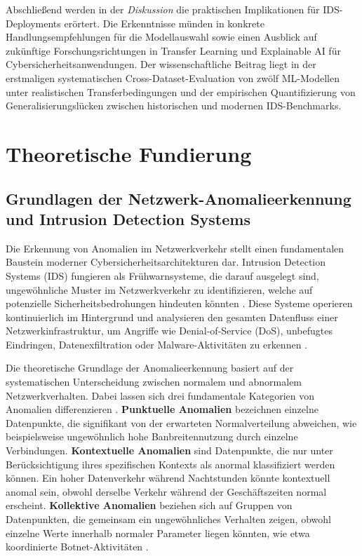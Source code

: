 \documentclass[11pt,a4paper]{article}
\begin{document}
    Abschließend werden in der \textit{Diskussion} die praktischen Implikationen für IDS-Deployments erörtert. Die Erkenntnisse münden in konkrete Handlungsempfehlungen für die Modellauswahl sowie einen Ausblick auf zukünftige Forschungsrichtungen in Transfer Learning und Explainable AI für Cybersicherheitsanwendungen. Der wissenschaftliche Beitrag liegt in der erstmaligen systematischen Cross-Dataset-Evaluation von zwölf ML-Modellen unter realistischen Transferbedingungen und der empirischen Quantifizierung von Generalisierungslücken zwischen historischen und modernen IDS-Benchmarks.


    \section{Theoretische Fundierung}

    \subsection{Grundlagen der Netzwerk-Anomalieerkennung und Intrusion Detection Systems}

    Die Erkennung von Anomalien im Netzwerkverkehr stellt einen fundamentalen Baustein moderner Cybersicherheitsarchitekturen dar. Intrusion Detection Systems (IDS) fungieren als Frühwarnsysteme, die darauf ausgelegt sind, ungewöhnliche Muster im Netzwerkverkehr zu identifizieren, welche  auf potenzielle Sicherheitsbedrohungen hindeuten könnten \parencite{Ring2019}. Diese Systeme operieren kontinuierlich im Hintergrund und analysieren den gesamten Datenfluss einer Netzwerkinfrastruktur, um Angriffe wie Denial-of-Service (DoS), unbefugtes Eindringen, Datenexfiltration oder Malware-Aktivitäten zu erkennen \parencite{Vinayakumar2019}.

    Die theoretische Grundlage der Anomalieerkennung basiert auf der systematischen Unterscheidung zwischen normalem und abnormalem Netzwerkverhalten. Dabei lassen sich drei fundamentale Kategorien von Anomalien differenzieren \parencite{Ring2019}. \textbf{Punktuelle Anomalien} bezeichnen einzelne Datenpunkte, die signifikant von der erwarteten Normalverteilung abweichen, wie beispielsweise ungewöhnlich hohe Banbreitennutzung durch einzelne Verbindungen. \textbf{Kontextuelle Anomalien} sind Datenpunkte, die nur unter Berücksichtigung ihres spezifischen Kontexts als anormal klassifiziert werden können. Ein hoher Datenverkehr während Nachtstunden könnte kontextuell anomal sein, obwohl derselbe Verkehr während der Geschäftszeiten normal erscheint. \textbf{Kollektive Anomalien} beziehen sich auf Gruppen von Datenpunkten, die gemeinsam ein ungewöhnliches Verhalten zeigen, obwohl einzelne Werte innerhalb normaler Parameter liegen könnten, wie etwa koordinierte Botnet-Aktivitäten \parencite{Ring2019}.
\end{document}
